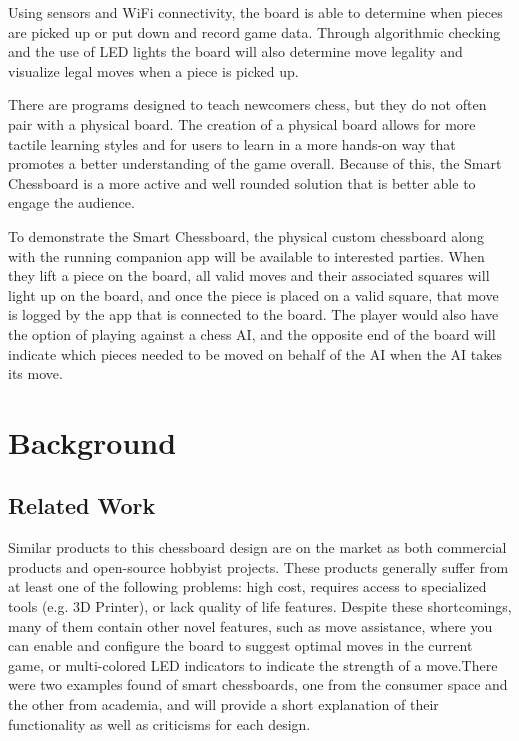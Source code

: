\documentclass[11pt,journal]{IEEEtran}
\begin{document}
Using sensors and WiFi connectivity, the board is able to determine when pieces are picked up or put down and record game data. Through algorithmic checking and the use of LED lights the board will also determine move legality and visualize legal moves when a piece is picked up.

There are programs designed to teach newcomers chess, but they do not often pair with a physical board. The creation of a physical board allows for more tactile learning styles and for users to learn in a more hands-on way that promotes a better understanding of the game overall.  Because of this, the Smart Chessboard is a more active and well rounded solution that is better able to engage the audience.



To demonstrate the Smart Chessboard, the physical custom chessboard along with the running companion app will be available to interested parties. When they lift a piece on the board, all valid moves and their associated squares will light up on the board, and once the piece is placed on a valid square, that move is logged by the app that is connected to the board. The player would also have the option of playing against a chess AI, and the opposite end of the board will indicate which pieces needed to be moved on behalf of the AI when the AI takes its move.

\section{Background}



\subsection{Related Work}

Similar products to this chessboard design are on the market as both commercial products and open-source hobbyist projects. These products generally suffer from at least one of the following problems: high cost, requires access to specialized tools (e.g. 3D Printer), or lack quality of life features. Despite these shortcomings, many of them contain other novel features, such as move assistance, where you can enable and configure the board to suggest optimal moves in the current game, or multi-colored LED indicators to indicate the strength of a move.There were two examples found of smart chessboards, one from the consumer space and the other from academia, and will provide a short explanation of their functionality as well as criticisms for each design.
\end{document}
